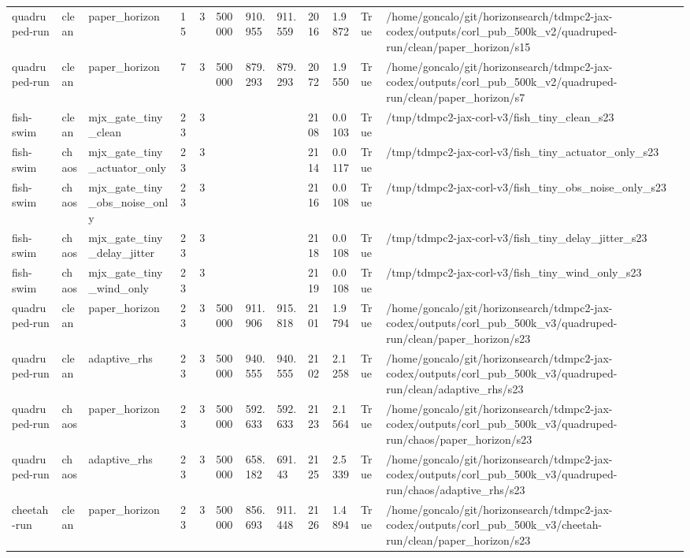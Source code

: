 \begin{tabular}{llllllllllll}
quadruped-run & clean & paper\_horizon & 15 & 3 & 500000 & 910.955 & 911.559 & 2016 & 1.9872 & True & /home/goncalo/git/horizonsearch/tdmpc2-jax-codex/outputs/corl\_pub\_500k\_v2/quadruped-run/clean/paper\_horizon/s15 \\
quadruped-run & clean & paper\_horizon & 7 & 3 & 500000 & 879.293 & 879.293 & 2072 & 1.9550 & True & /home/goncalo/git/horizonsearch/tdmpc2-jax-codex/outputs/corl\_pub\_500k\_v2/quadruped-run/clean/paper\_horizon/s7 \\
fish-swim & clean & mjx\_gate\_tiny\_clean & 23 & 3 &  &  &  & 2108 & 0.0103 & True & /tmp/tdmpc2-jax-corl-v3/fish\_tiny\_clean\_s23 \\
fish-swim & chaos & mjx\_gate\_tiny\_actuator\_only & 23 & 3 &  &  &  & 2114 & 0.0117 & True & /tmp/tdmpc2-jax-corl-v3/fish\_tiny\_actuator\_only\_s23 \\
fish-swim & chaos & mjx\_gate\_tiny\_obs\_noise\_only & 23 & 3 &  &  &  & 2116 & 0.0108 & True & /tmp/tdmpc2-jax-corl-v3/fish\_tiny\_obs\_noise\_only\_s23 \\
fish-swim & chaos & mjx\_gate\_tiny\_delay\_jitter & 23 & 3 &  &  &  & 2118 & 0.0108 & True & /tmp/tdmpc2-jax-corl-v3/fish\_tiny\_delay\_jitter\_s23 \\
fish-swim & chaos & mjx\_gate\_tiny\_wind\_only & 23 & 3 &  &  &  & 2119 & 0.0108 & True & /tmp/tdmpc2-jax-corl-v3/fish\_tiny\_wind\_only\_s23 \\
quadruped-run & clean & paper\_horizon & 23 & 3 & 500000 & 911.906 & 915.818 & 2101 & 1.9794 & True & /home/goncalo/git/horizonsearch/tdmpc2-jax-codex/outputs/corl\_pub\_500k\_v3/quadruped-run/clean/paper\_horizon/s23 \\
quadruped-run & clean & adaptive\_rhs & 23 & 3 & 500000 & 940.555 & 940.555 & 2102 & 2.1258 & True & /home/goncalo/git/horizonsearch/tdmpc2-jax-codex/outputs/corl\_pub\_500k\_v3/quadruped-run/clean/adaptive\_rhs/s23 \\
quadruped-run & chaos & paper\_horizon & 23 & 3 & 500000 & 592.633 & 592.633 & 2123 & 2.1564 & True & /home/goncalo/git/horizonsearch/tdmpc2-jax-codex/outputs/corl\_pub\_500k\_v3/quadruped-run/chaos/paper\_horizon/s23 \\
quadruped-run & chaos & adaptive\_rhs & 23 & 3 & 500000 & 658.182 & 691.43 & 2125 & 2.5339 & True & /home/goncalo/git/horizonsearch/tdmpc2-jax-codex/outputs/corl\_pub\_500k\_v3/quadruped-run/chaos/adaptive\_rhs/s23 \\
cheetah-run & clean & paper\_horizon & 23 & 3 & 500000 & 856.693 & 911.448 & 2126 & 1.4894 & True & /home/goncalo/git/horizonsearch/tdmpc2-jax-codex/outputs/corl\_pub\_500k\_v3/cheetah-run/clean/paper\_horizon/s23 \\

\end{tabular}
